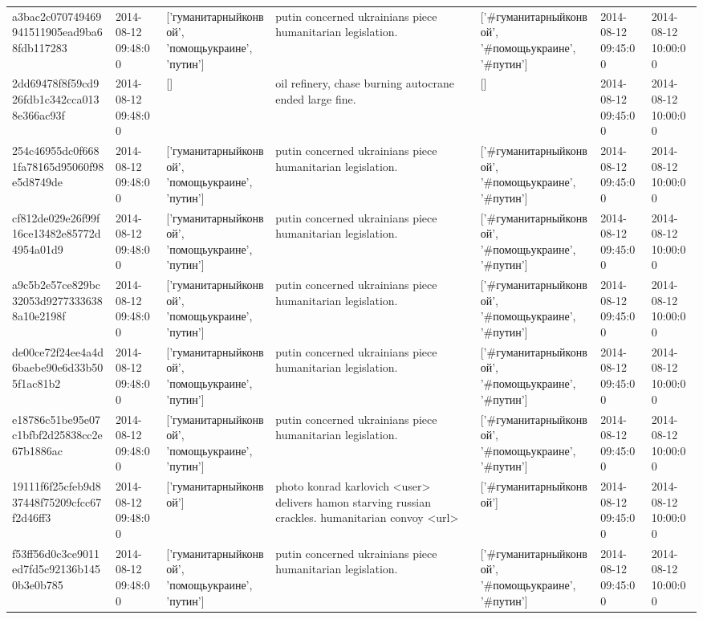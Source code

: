 \begin{tabular}{lllllll}
a3bac2c070749469941511905ead9ba68fdb117283 & 2014-08-12 09:48:00 & ['гуманитарныйконвой', 'помощьукраине', 'путин'] & putin concerned ukrainians piece humanitarian legislation. & ['#гуманитарныйконвой', '#помощьукраине', '#путин'] & 2014-08-12 09:45:00 & 2014-08-12 10:00:00 \\
2dd69478f8f59cd926fdb1c342cca0138e366ac93f & 2014-08-12 09:48:00 & [] & oil refinery, chase burning autocrane ended large fine. & [] & 2014-08-12 09:45:00 & 2014-08-12 10:00:00 \\
254c46955dc0f6681fa78165d95060f98e5d8749de & 2014-08-12 09:48:00 & ['гуманитарныйконвой', 'помощьукраине', 'путин'] & putin concerned ukrainians piece humanitarian legislation. & ['#гуманитарныйконвой', '#помощьукраине', '#путин'] & 2014-08-12 09:45:00 & 2014-08-12 10:00:00 \\
cf812de029e26f99f16ce13482e85772d4954a01d9 & 2014-08-12 09:48:00 & ['гуманитарныйконвой', 'помощьукраине', 'путин'] & putin concerned ukrainians piece humanitarian legislation. & ['#гуманитарныйконвой', '#помощьукраине', '#путин'] & 2014-08-12 09:45:00 & 2014-08-12 10:00:00 \\
a9c5b2e57ce829bc32053d92773336388a10e2198f & 2014-08-12 09:48:00 & ['гуманитарныйконвой', 'помощьукраине', 'путин'] & putin concerned ukrainians piece humanitarian legislation. & ['#гуманитарныйконвой', '#помощьукраине', '#путин'] & 2014-08-12 09:45:00 & 2014-08-12 10:00:00 \\
de00ce72f24ee4a4d6baebe90e6d33b505f1ac81b2 & 2014-08-12 09:48:00 & ['гуманитарныйконвой', 'помощьукраине', 'путин'] & putin concerned ukrainians piece humanitarian legislation. & ['#гуманитарныйконвой', '#помощьукраине', '#путин'] & 2014-08-12 09:45:00 & 2014-08-12 10:00:00 \\
e18786c51be95e07c1bfbf2d25838cc2e67b1886ac & 2014-08-12 09:48:00 & ['гуманитарныйконвой', 'помощьукраине', 'путин'] & putin concerned ukrainians piece humanitarian legislation. & ['#гуманитарныйконвой', '#помощьукраине', '#путин'] & 2014-08-12 09:45:00 & 2014-08-12 10:00:00 \\
19111f6f25cfeb9d837448f75209cfcc67f2d46ff3 & 2014-08-12 09:48:00 & ['гуманитарныйконвой'] & photo konrad karlovich <user> delivers hamon starving russian crackles. humanitarian convoy <url> & ['#гуманитарныйконвой'] & 2014-08-12 09:45:00 & 2014-08-12 10:00:00 \\
f53ff56d0c3ce9011ed7fd5c92136b1450b3e0b785 & 2014-08-12 09:48:00 & ['гуманитарныйконвой', 'помощьукраине', 'путин'] & putin concerned ukrainians piece humanitarian legislation. & ['#гуманитарныйконвой', '#помощьукраине', '#путин'] & 2014-08-12 09:45:00 & 2014-08-12 10:00:00 \\

\end{tabular}
